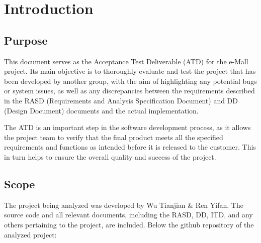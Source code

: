 \chapter{Introduction}
\section{Purpose}
This document serves as the Acceptance Test Deliverable (ATD) for the e-Mall project. Its main objective is to thoroughly evaluate and test the project that has been developed by another group, with the aim of highlighting any potential bugs or system issues, as well as any discrepancies between the requirements described in the RASD (Requirements and Analysis Specification Document) and DD (Design Document) documents and the actual implementation.

The ATD is an important step in the software development process, as it allows the project team to verify that the final product meets all the specified requirements and functions as intended before it is released to the customer. This in turn helps to ensure the overall quality and success of the project.
\section{Scope}
The project being analyzed was developed by Wu Tianjian & Ren Yifan. The source code and all relevant documents, including the RASD, DD, ITD, and any others pertaining to the project, are included. Below the github repository of the analyzed project: \\ \emph{\href{https://github.com/YifanRenWind/TianjianYifan}{\color{cyan}{Wu Tianjian & Ren Yifan project repository}}}